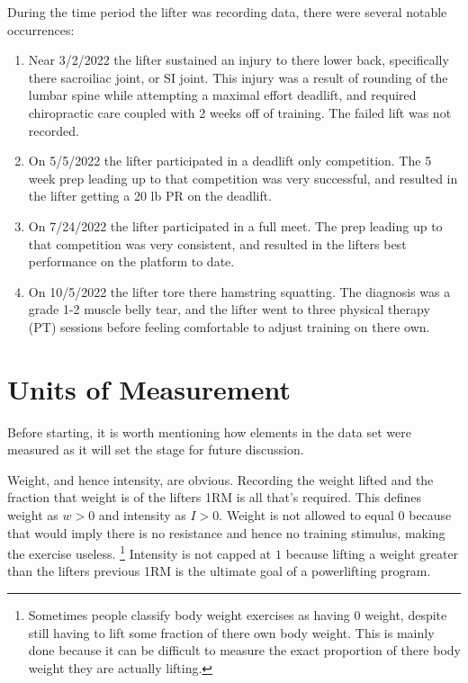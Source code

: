 During the time period the lifter was recording data, there were several notable occurrences:

\begin{enumerate}
    \item Near 3/2/2022 the lifter sustained an injury to there lower back, specifically there sacroiliac joint, or SI joint. This injury was a result of rounding of the lumbar spine while attempting a maximal effort deadlift, and required chiropractic care coupled with 2 weeks off of training. The failed lift was not recorded.
    
    \item On 5/5/2022 the lifter participated in a deadlift only competition. The 5 week prep leading up to that competition was very successful, and resulted in the lifter getting a 20 lb PR on the deadlift.
    
    \item On 7/24/2022 the lifter participated in a full meet. The prep leading up to that competition was very consistent, and resulted in the lifters best performance on the platform to date.
    
    \item On 10/5/2022 the lifter tore there hamstring squatting. The diagnosis was a grade 1-2 muscle belly tear, and the lifter went to three physical therapy (PT) sessions before feeling comfortable to adjust training on there own.
\end{enumerate}

\section{Units of Measurement}
\label{sec:UnitsOfMeasurement}

Before starting, it is worth mentioning how elements in the data set were measured as it will set the stage for future discussion.

Weight, and hence intensity, are obvious. Recording the weight lifted and the fraction that weight is of the lifters 1RM is all that's required. This defines weight as $w> 0$ and intensity as $I>0$. Weight is not allowed to equal $0$ because that would imply there is no resistance and hence no training stimulus, making the exercise useless. \footnote{Sometimes people classify body weight exercises as having $0$ weight, despite still having to lift some fraction of there own body weight. This is mainly done because it can be difficult to measure the exact proportion of there body weight they are actually lifting.} Intensity is not capped at $1$ because lifting a weight greater than the lifters previous 1RM is the ultimate goal of a powerlifting program.

